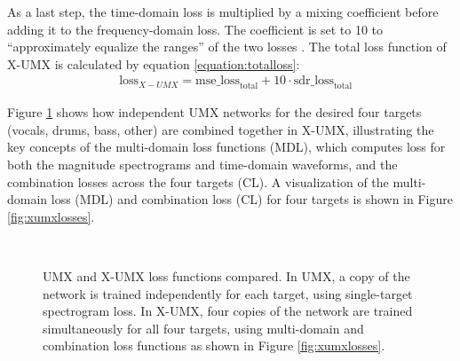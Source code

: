 \documentclass[report.tex]{subfiles}
\begin{document}
As a last step, the time-domain loss is multiplied by a mixing coefficient before adding it to the frequency-domain loss. The coefficient is set to 10 to ``approximately equalize the ranges'' of the two losses \parencite[4]{xumx}. The total loss function of X-UMX is calculated by equation \eqref{equation:totalloss}:
\begin{align}\tag{33}\label{equation:totalloss}
	\nonumber & \text{loss}_{X-UMX} = \text{mse\_loss}_{\text{total}} + 10 \cdot \text{sdr\_loss}_{\text{total}}
\end{align}

Figure \ref{fig:umxandxumx} shows how independent UMX networks for the desired four targets (vocals, drums, bass, other) are combined together in X-UMX, illustrating the key concepts of the multi-domain loss functions (MDL), which computes loss for both the magnitude spectrograms and time-domain waveforms, and the combination losses across the four targets (CL). A visualization of the multi-domain loss (MDL) and combination loss (CL) for four targets is shown in Figure \ref{fig:xumxlosses}.

\begin{figure}[ht]
	\centering
	\\
	\caption{UMX and X-UMX loss functions compared. In UMX, a copy of the network is trained independently for each target, using single-target spectrogram loss. In X-UMX, four copies of the network are trained simultaneously for all four targets, using multi-domain and combination loss functions as shown in Figure \ref{fig:xumxlosses}.}
	\label{fig:umxandxumx}
\end{figure}
\end{document}
